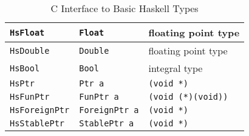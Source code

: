 \documentclass[a4paper,twoside]{article}
\newcommand{\code}[1]{\texttt{#1}}      %
\begin{document}
\begin{table}
\begin{center}
\begin{tabular}{|l|l|l|}
      \hline
      \code{HsFloat}    & \code{Float}
      & floating point type\\
     \hline
      \code{HsDouble}   & \code{Double}
      & floating point type\\
     \hline
      \code{HsBool}     & \code{Bool}
      & integral type\\
     \hline
      \code{HsPtr}      & \code{Ptr a}
      & \code{(void *)}\\
     \hline
      \code{HsFunPtr}   & \code{FunPtr a}
      & \code{(void (*)(void))}\\
     \hline
      \code{HsForeignPtr}& \code{ForeignPtr a}
      & \code{(void *)}\\
     \hline
      \code{HsStablePtr}& \code{StablePtr a}
      & \code{(void *)}\\
     \hline
    \end{tabular}
    \caption{C Interface to Basic Haskell Types}
    \label{tab:c-haskell-types}
  \end{center}
\end{table}
%
\end{document}
